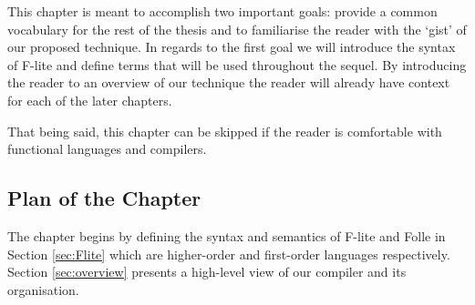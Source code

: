This chapter is meant to accomplish two important goals: provide a common
vocabulary for the rest of the thesis and to familiarise the reader with the
`gist' of our proposed technique. In regards to the first goal we will
introduce the syntax of F-lite and define terms that will be used throughout
the sequel. By introducing the reader to an overview of our technique the
reader will already have context for each of the later chapters.

That being said, this chapter can be skipped if the reader is comfortable with
functional languages and compilers.

\subsection*{Plan of the Chapter}

The chapter begins by defining the syntax and semantics of F-lite and Folle in
Section \ref{sec:Flite} which are higher-order and first-order languages
respectively. Section \ref{sec:overview} presents a high-level view of our
compiler and its organisation.
